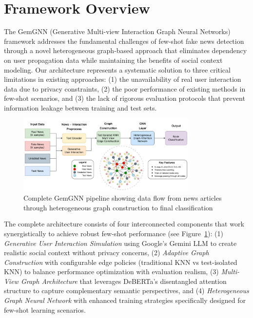 
\section{Framework Overview}

The GemGNN (Generative Multi-view Interaction Graph Neural Networks) framework addresses the fundamental challenges of few-shot fake news detection through a novel heterogeneous graph-based approach that eliminates dependency on user propagation data while maintaining the benefits of social context modeling. Our architecture represents a systematic solution to three critical limitations in existing approaches: (1) the unavailability of real user interaction data due to privacy constraints, (2) the poor performance of existing methods in few-shot scenarios, and (3) the lack of rigorous evaluation protocols that prevent information leakage between training and test sets.

\begin{figure}[h]
    \centering
    \includegraphics[width=0.8\textwidth]{context/methodology/fig/pipeline.png}
    \caption{Complete GemGNN pipeline showing data flow from news articles through heterogeneous graph construction to final classification}
    \label{fig:pipeline}
\end{figure}

The complete architecture consists of four interconnected components that work synergistically to achieve robust few-shot performance (see Figure~\ref{fig:pipeline}): (1) \emph{Generative User Interaction Simulation} using Google's Gemini LLM to create realistic social context without privacy concerns, (2) \emph{Adaptive Graph Construction} with configurable edge policies (traditional KNN vs test-isolated KNN) to balance performance optimization with evaluation realism, (3) \emph{Multi-View Graph Architecture} that leverages DeBERTa's disentangled attention structure to capture complementary semantic perspectives, and (4) \emph{Heterogeneous Graph Neural Network} with enhanced training strategies specifically designed for few-shot learning scenarios.

